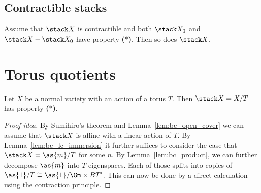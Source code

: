 \documentclass{ck-article}
\newcommand\bc{\textbf{($\mathbf{*}$)}}
\begin{document}

\subsection{Contractible stacks}

\begin{Lem}
    Assume that $\stack X$ is contractible and both $\stack X_0$ and $\stack X\setminus \stack X_0$ have property \bc.
    Then so does $\stack X$.
\end{Lem}

\section{Torus quotients}

\begin{Thm}
    Let $X$ be a normal variety with an action of a torus $T$.
    Then $\stack X = X/T$ has property \bc.
\end{Thm}

\begin{proof}[Proof idea]
    By Sumihiro's theorem \cite{Sumihiro:1974:EquivariantCompletions} and Lemma~\ref{lem:bc_open_cover} we can assume that $\stack X$ is affine with a linear action of $T$.
    By Lemma~\ref{lem:bc_lc_immersion} it further suffices to consider the case that $\stack X = \as{m}/T$ for some $n$.
    By Lemma~\ref{lem:bc_product}, we can further decompose $\as{m}$ into $T$-eigenspaces.
    Each of those splits into copies of $\as{1}/T \cong \as{1}/\Gm \times BT'$.
    This can now be done by a direct calculation using the contraction principle.
\end{proof}

\printbibliography
\end{document}
